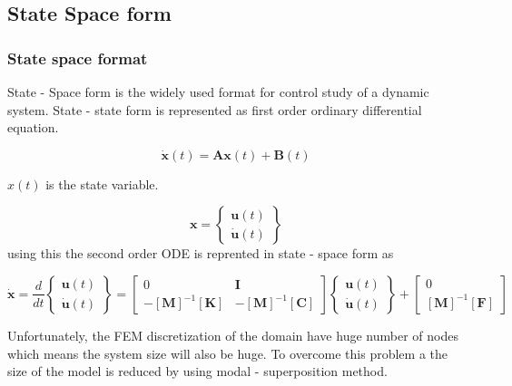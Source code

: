 \documentclass[9pt]{beamer}
\newcommand{\vect}[1]{\boldsymbol{#1}}
\begin{document}
\subsection{State Space form}

\begin{frame}\frametitle{State space format}

State - Space form is the widely used format for control study of a dynamic system. State - state form is represented as first order ordinary differential equation.

\begin{equation*}\label{eq:SpaceState}
\vect{\dot{x}}(t)=\vect{A} \vect{x} (t)+\vect{B} (t)
\end{equation*}

$x(t)$ is the state variable.

\begin{equation*}
\vect{x} = 
\left\{
\begin{array}{r}
\vect{u}(t)
\\
\vect{\dot{u}}(t)
\end{array}
\right\}
\end{equation*}
using this the second order ODE is reprented in state - space form as

\begin{equation*}
\vect{\dot{x}} = \frac{d}{dt}
\left\{
 \begin{array}{r}  \vect{u}(t)  \\  \vect{\dot{u}}(t) \end{array}
\right\}
=
\begin{bmatrix}
0 & \vect{I} \\
-\left[\vect{M}\right] ^{-1} \left[\vect{K}\right]  &   -\left[\vect{M}\right] ^{-1} \left[\vect{C}\right]
\end{bmatrix}
\left\{
\begin{array}{r}
\vect{u}(t)
\\
\vect{\dot{u}}(t)
\end{array}
\right\}
+
\begin{bmatrix}
0 \\
\left[\vect{M}\right] ^{-1} \left[\vect{F}\right] 
\end{bmatrix}
\end{equation*}

Unfortunately, the FEM discretization of the domain have huge number of nodes which means the system size will also be huge. To overcome this problem a the size of the model is reduced by using modal - superposition method.



\end{frame}
\end{document}

